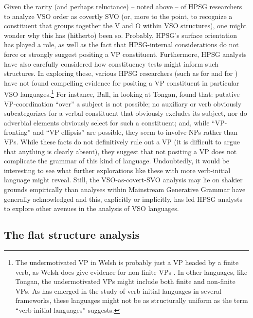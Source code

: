 \documentclass[output=paper
                ,modfonts
                ,nonflat
	        ,collection
	        ,collectionchapter
	        ,collectiontoclongg
 	        ,biblatex
                ,babelshorthands
                ,newtxmath
                ,draftmode
                ,colorlinks, citecolor=brown
]{./langsci/langscibook}
\begin{document}
{Given the rarity (and perhaps reluctance) -- noted above -- of HPSG researchers to analyze VSO order as covertly SVO (or, more to the point, to recognize a constituent that groups together the V and O within VSO structures), one might wonder why this has (hitherto) been so. Probably, HPSG's surface orientation has played a role, as well as the fact that HPSG-internal considerations do not force or strongly suggest positing a VP constituent. Furthermore, HPSG analysts have also carefully considered how constituency tests might inform such structures. In exploring these, various HPSG researchers (such as \citealt{borsley06} for  and \citealt[Chapter 3]{ball08thesis} for ) have not found compelling evidence for positing a VP constituent in particular VSO languages.\footnote{The undermotivated VP in Welsh is probably just a VP headed by a finite verb, as Welsh does give evidence for non-finite VPs \citep{BTW07}. In other languages, like Tongan, the undermotivated VPs might include both finite and non-finite VPs. As has emerged in the study of verb-initial languages in several frameworks, these languages might not be as structurally uniform as the term ``verb-initial languages'' suggests.} For instance, Ball, in looking at Tongan, found that: putative VP-coordination ``over'' a subject is not possible; no auxiliary or verb obviously subcategorizes for a verbal constituent that obviously excludes its subject, nor do adverbial elements obviously select for such a constituent; and, while ``VP-fronting'' and ``VP-ellipsis'' are possible, they seem to involve NPs rather than VPs. While these facts do not definitively rule out a VP (it is difficult to argue that anything is clearly absent), they suggest that not positing a VP does not complicate the grammar of this kind of language. Undoubtedly, it would be interesting to see what further explorations like these with more verb-initial language might reveal. Still, the VSO-as-covert-SVO analysis may lie on shakier grounds empirically than analyses within Mainstream Generative Grammar have generally acknowledged and this, explicitly or implicitly, has led HPSG analysts to explore other avenues in the analysis of VSO languages.           

\subsection{The flat structure analysis}
\label{understudied-sec-flat}

}
\end{document}
